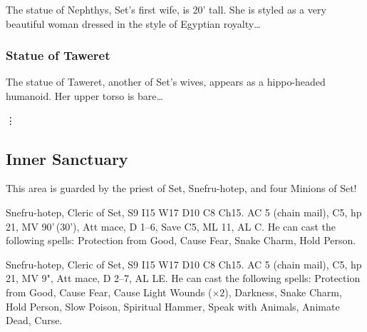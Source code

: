 \documentclass[letterpaper,serif]{module}
\begin{document}
The statue of Nephthys, Set's first wife, is 20' tall. She is styled as a very beautiful woman dressed in the
style of Egyptian royalty\ldots

\subsubsection{Statue of Taweret} %

The statue of Taweret, another of Set's wives, appears as a hippo-headed humanoid. Her upper torso is bare\ldots

\vdots

\setcounter{subsection}{13} %

\subsection{Inner Sanctuary} %
\label{inner_sanctuary}

This area is guarded by the priest of Set, Snefru-hotep, and four Minions of Set!
\begin{statblockfreestyle}
\begin{ifbasicstats}
Snefru-hotep, Cleric of Set, S9 I15 W17 D10 C8 Ch15. AC 5 (chain mail), C5, hp 21, MV 90'\,(30'), Att mace, D 1--6, Save C5, ML 11, AL C.
He can cast the following spells: Protection from Good, Cause Fear, Snake Charm, Hold Person.
\end{ifbasicstats}
\begin{ifadvancedstats}
Snefru-hotep, Cleric of Set, S9 I15 W17 D10 C8 Ch15. AC 5 (chain mail), C5, hp 21, MV 9", Att mace, D 2--7, AL LE.
He can cast the following spells: Protection from Good, Cause Fear, Cause Light Wounds ($\times 2$), Darkness,
Snake Charm, Hold Person, Slow Poison, Spiritual Hammer, Speak with Animals, Animate Dead, Curse.
\end{ifadvancedstats}
\end{statblockfreestyle}
\lipsum[10-11]

\end{document}
